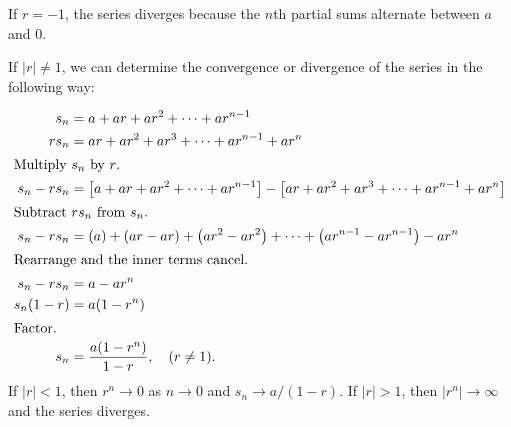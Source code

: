 If $r=-1$, the series diverges because the $n$th partial sums alternate between
$a$ and $0$.

If $|r| \neq 1$, we can determine the convergence or divergence of the series in
the following way:

\begin{align*}
  s_n &= a + ar + ar^2 + \cdots + ar^{n-1} \\
  rs_n &= ar + ar^2 + ar^3 + \cdots + ar^{n-1} + ar^n \\ \intertext{Multiply $s_n$ by
  $r$.}
  s_n - rs_n &= \left[ a + ar + ar^2 + \cdots + ar^{n-1} \right]
  -\left[ ar + ar^2 + ar^3 + \cdots + ar^{n-1} + ar^n \right] \\
  \intertext{Subtract $rs_n$ from $s_n$.}
  s_n-rs_n &= \left( a \right)+\left( ar - ar \right)+ \left( ar^2 -
    ar^2   \right) + \cdots + \left( ar^{n-1}-ar^{n-1} \right)-ar^n \\
  \intertext{Rearrange and the inner terms cancel.}
  s_n - rs_n &= a - ar^n \\
  s_n(1-r) &= a(1-r^n) \\ \intertext{Factor.}
  s_n &= \frac{a(1-r^n)}{1-r}, \quad (r \neq 1).
\end{align*}
If $|r| < 1$, then $r^n \to 0$ as $n \to 0$ and $s_n \to a/(1-r)$. If $|r| > 1$,
then $|r^n| \to \infty$ and the series diverges.\cite[p.~546]{thomas}

